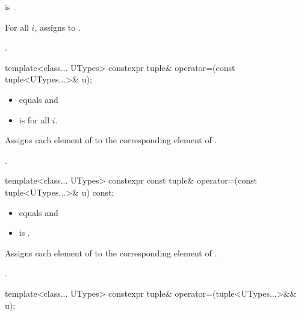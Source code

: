 \begin{itemdescr}
\pnum
\constraints
{} is .

\pnum
\effects
For all $i$,
assigns  to .

\pnum
\returns
{}.
\end{itemdescr}

%
\begin{itemdecl}
template<class... UTypes> constexpr tuple& operator=(const tuple<UTypes...>& u);
\end{itemdecl}

\begin{itemdescr}
\pnum
\constraints
\begin{itemize}
\item {} equals  and
\item {} is  for all $i$.
\end{itemize}

\pnum
\effects
Assigns each element of  to the corresponding element
of .

\pnum
\returns
{}.
\end{itemdescr}

%
\begin{itemdecl}
template<class... UTypes> constexpr const tuple& operator=(const tuple<UTypes...>& u) const;
\end{itemdecl}

\begin{itemdescr}
\pnum
\constraints
\begin{itemize}
\item
{} equals  and
\item
{} is .
\end{itemize}

\pnum
\effects
Assigns each element of  to the corresponding element of .

\pnum
\returns
{}.
\end{itemdescr}

%
\begin{itemdecl}
template<class... UTypes> constexpr tuple& operator=(tuple<UTypes...>&& u);
\end{itemdecl}

